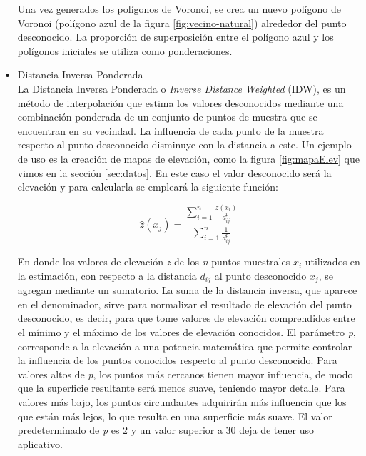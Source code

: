 \begin{itemize}
    Una vez generados los polígonos de Voronoi, se crea un nuevo polígono de Voronoi (polígono azul de la figura \ref{fig:vecino-natural}) alrededor del punto desconocido.
    La proporción de superposición entre el polígono azul y los polígonos iniciales se utiliza como ponderaciones.

    \item Distancia Inversa Ponderada \\
    La Distancia Inversa Ponderada o \textit{Inverse Distance Weighted} (IDW), es un método de interpolación que estima los valores desconocidos mediante
    una combinación ponderada de un conjunto de puntos de muestra que se encuentran en su vecindad.
    La influencia de cada punto de la muestra respecto al punto desconocido disminuye con la distancia a este.
    Un ejemplo de uso es la creación de mapas de elevación, como la figura \ref{fig:mapaElev} que vimos en la sección \ref{sec:datos}.
    En este caso el valor desconocido será la elevación y para calcularla se empleará la siguiente función:

    \begin{equation}
        \widehat{z}(x_{j}) = \frac{\displaystyle \sum_{i=1}^{n} \frac{z(x_{i})}{d_{ij}^{p}}}{\displaystyle \sum_{i=1}^{n} \frac{1}{d_{ij}^{p}}} \nonumber
    \end{equation}

    En donde los valores de elevación \textit{z} de los \textit{n} puntos muestrales $x_{i}$ utilizados en la estimación, con respecto a la distancia $d_{ij}$ al punto desconocido $x_{j}$, se agregan mediante un sumatorio.
    La suma de la distancia inversa, que aparece en el denominador, sirve para normalizar el resultado de elevación del punto desconocido, 
    es decir, para que tome valores de elevación comprendidos entre el mínimo y el máximo de los valores de elevación conocidos.
    El parámetro \textit{p}, corresponde a la elevación a una potencia matemática que permite controlar la influencia de los puntos conocidos respecto al punto desconocido.
    Para valores altos de \textit{p}, los puntos más cercanos tienen mayor influencia, de modo que la superficie resultante será menos suave, teniendo mayor detalle.
    Para valores más bajo, los puntos circundantes adquirirán más influencia que los que están más lejos, lo que resulta en una superficie más suave.
    El valor predeterminado de \textit{p} es 2 y un valor superior a 30 deja de tener uso aplicativo.


\end{itemize}
